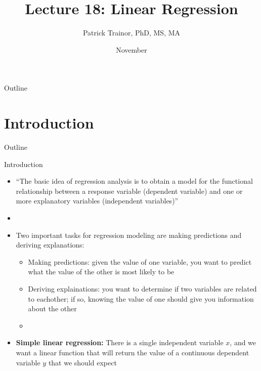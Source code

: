 \documentclass[xcolor=dvipsnames]{beamer}
\title[Lecture 18]{Lecture 18: Linear Regression}
\author[Patrick Trainor]{Patrick Trainor, PhD, MS, MA}
\institute[NMSU]{New Mexico State University}
\date{November}
\begin{document}
\begin{frame}
\maketitle
\end{frame}

\begin{frame}{Outline}
\tableofcontents[hideallsubsections]
\end{frame}

\section{Introduction}
\begin{frame}{Outline}
\tableofcontents[currentsection,subsectionstyle=show/shaded/hide]
\end{frame}

\begin{frame}{Introduction}
	\begin{itemize}
		\item ``The basic idea of regression analysis is to obtain a model for the functional relationship between a response variable (dependent variable) and one or more explanatory variables (independent variables)''
		\item[]
		\item Two important tasks for regression modeling are making predictions and deriving explanations:
		\begin{itemize}
			\item Making predictions: given the value of one variable, you want to predict what the value of the other is most likely to be
			\item Deriving explainations: you want to determine if two variables are related to eachother; if so, knowing the value of one should give you information about the other
			\item[]
		\end{itemize}
		\item \textbf{Simple linear regression:} There is a single independent variable $x$, and we want a linear function that will return the value of a continuous dependent variable $y$ that we should expect
	\end{itemize}
\end{frame}
\end{document}
